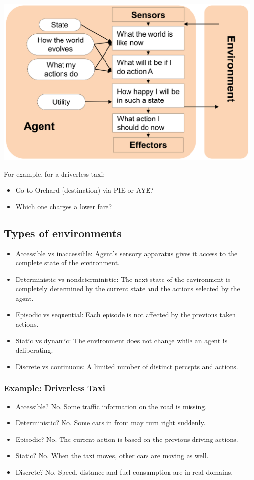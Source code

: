 \documentclass[11pt]{article}
\begin{document}
\begin{center}
\includegraphics[width=.9\linewidth]{./images/utility-based-agent-diagram.png}
\end{center}

For example, for a driverless taxi:
\begin{itemize}
\item Go to Orchard (destination) via PIE or AYE?
\item Which one charges a lower fare?
\end{itemize}

 \newpage
\subsection{Types of environments}
\label{sec:org47fc3bf}
\begin{itemize}
\item Accessible vs inaccessible: Agent's sensory apparatus gives it access to the complete state of the environment.
\item Deterministic vs nondeterministic: The next state of the environment is completely determined by the current state and the actions selected by the agent.
\item Episodic vs sequential: Each episode is not affected by the previous taken actions.
\item Static vs dynamic: The environment does not change while an agent is deliberating.
\item Discrete vs continuous: A limited number of distinct percepts and actions.
\end{itemize}
\subsubsection{Example: Driverless Taxi}
\label{sec:org8b5d214}
\begin{itemize}
\item Accessible? No. Some traffic information on the road is missing.
\item Deterministic? No. Some cars in front may turn right suddenly.
\item Episodic? No. The current action is based on the previous driving actions.
\item Static? No. When the taxi moves, other cars are moving as well.
\item Discrete? No. Speed, distance and fuel consumption are in real domains.
\end{itemize}
\end{document}

